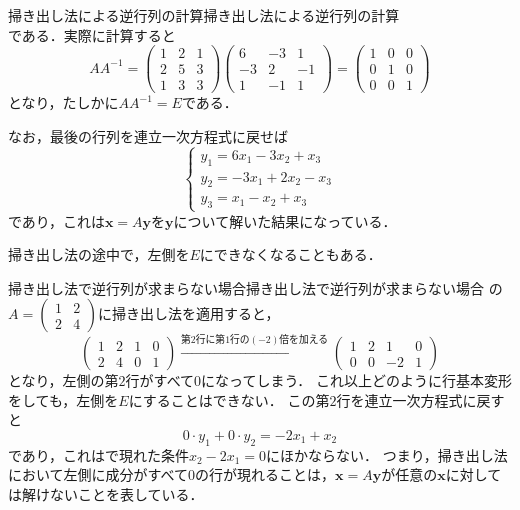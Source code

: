 \begin{example}{掃き出し法による逆行列の計算}{掃き出し法による逆行列の計算}
\[  \]
  である．実際に計算すると
  \[
    AA^{-1} =
    \begin{pmatrix} 1 & 2 & 1 \\ 2 & 5 & 3 \\ 1 & 3 & 3 \end{pmatrix}
    \begin{pmatrix} 6 & -3 & 1 \\ -3 & 2 & -1 \\ 1 & -1 & 1 \end{pmatrix}
    =
    \begin{pmatrix} 1 & 0 & 0 \\ 0 & 1 & 0 \\ 0 & 0 & 1 \end{pmatrix}
  \]
  となり，たしかに$AA^{-1} = E$である．

  なお，最後の行列を連立一次方程式に戻せば
  \[
    \begin{cases}
      y_1 = 6x_1 - 3x_2 + x_3 \\
      y_2 = -3x_1 + 2x_2 - x_3 \\
      y_3 = x_1 - x_2 + x_3
    \end{cases}
  \]
  であり，これは$\bm{x} = A\bm{y}$を$\bm{y}$について解いた結果になっている．
\end{example}

掃き出し法の途中で，左側を$E$にできなくなることもある．

\begin{example}{掃き出し法で逆行列が求まらない場合}{掃き出し法で逆行列が求まらない場合}
  の$A = \begin{pmatrix} 1 & 2 \\ 2 & 4 \end{pmatrix}$に掃き出し法を適用すると，
  \[
    \left(
    \begin{array}{cc|cc}
      1 & 2 & 1 & 0 \\
      2 & 4 & 0 & 1
    \end{array}
    \right)
    \xrightarrow{\text{第2行に第1行の$(-2)$倍を加える}}
    \left(
    \begin{array}{cc|cc}
      1 & 2 & 1 & 0 \\
      0 & 0 & -2 & 1
    \end{array}
    \right)
  \]
  となり，左側の第$2$行がすべて$0$になってしまう．
  これ以上どのように行基本変形をしても，左側を$E$にすることはできない．
  この第$2$行を連立一次方程式に戻すと
  \[
    0 \cdot y_1 + 0 \cdot y_2 = -2x_1 + x_2
  \]
  であり，これはで現れた条件$x_2 - 2x_1 = 0$にほかならない．
  つまり，掃き出し法において左側に成分がすべて$0$の行が現れることは，$\bm{x} = A\bm{y}$が任意の$\bm{x}$に対しては解けないことを表している．
\end{example}

